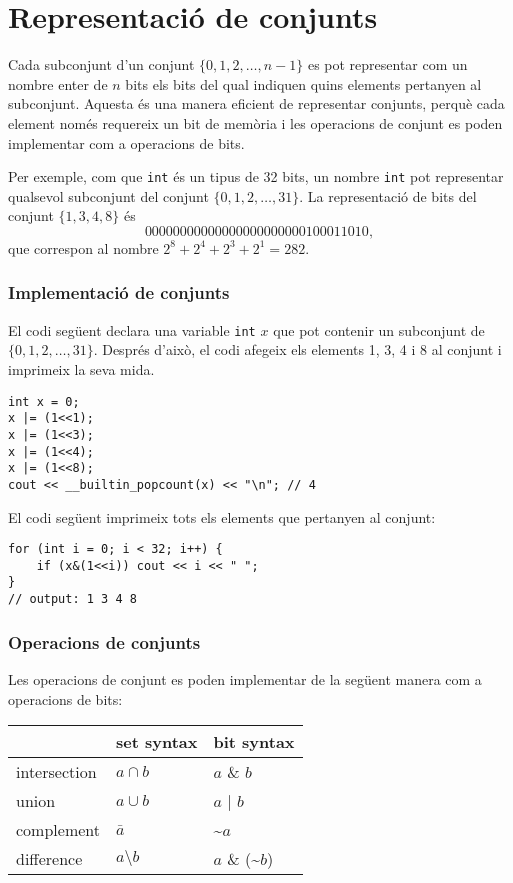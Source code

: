 \section{Representació de conjunts}

Cada subconjunt d'un conjunt $\{0,1,2,\ldots,n-1\}$ es pot representar
com un nombre enter de $n$ bits els bits del qual indiquen quins
elements pertanyen al subconjunt. Aquesta és una manera eficient de
representar conjunts, perquè cada element només requereix un bit de
memòria i les operacions de conjunt es poden implementar com a
operacions de bits.

Per exemple, com que \texttt{int} és un tipus de 32 bits, un nombre
\texttt{int} pot representar qualsevol subconjunt del conjunt
$\{0,1,2,\ldots,31\}$. La representació de bits del conjunt
$\{1,3,4,8\}$ és
\[00000000000000000000000100011010,\]
que correspon al nombre $2^8+2^4+2^3+2^1=282$.

\subsubsection{Implementació de conjunts}

El codi següent declara una variable \texttt{int} $x$ que pot contenir
un subconjunt de $\{0,1,2,\ldots,31\}$. Després d'això, el codi
afegeix els elements 1, 3, 4 i 8 al conjunt i imprimeix la seva mida.
\begin{lstlisting}
int x = 0;
x |= (1<<1);
x |= (1<<3);
x |= (1<<4);
x |= (1<<8);
cout << __builtin_popcount(x) << "\n"; // 4
\end{lstlisting}
El codi següent imprimeix tots els elements que pertanyen al conjunt:
\begin{lstlisting}
for (int i = 0; i < 32; i++) {
    if (x&(1<<i)) cout << i << " ";
}
// output: 1 3 4 8
\end{lstlisting}


\subsubsection{Operacions de conjunts}

Les operacions de conjunt es poden implementar de la següent manera
com a operacions de bits:


\begin{center}
\begin{tabular}{lll}
& set syntax & bit syntax \\
\hline
intersection & $a \cap b$ & $a$ \& $b$ \\
union & $a \cup b$ & $a$ | $b$ \\
complement & $\bar a$ & \textasciitilde$a$ \\
difference & $a \setminus b$ & $a$ \& (\textasciitilde$b$) \\
\end{tabular}
\end{center}


